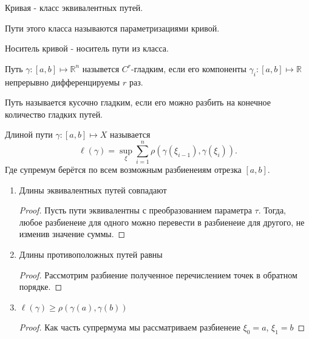 \begin{definition}[Кривая] \thmslashn 

    Кривая - класс эквивалентных путей.

    Пути этого класса называются параметризациями кривой.

    Носитель кривой - носитель пути из класса.
\end{definition}
\begin{definition} \thmslashn 

    Путь $\gamma : [a, b] \mapsto \mathbb{R}^{n}$ назывется $C^{r}$-гладким, если его компоненты $\gamma_{i} : [a, b] \mapsto \mathbb{R}$ непрерывно дифференцируемы $r$ раз.
\end{definition}
\begin{definition} \thmslashn 

    Путь называется кусочно гладким, если его можно разбить на конечное количество гладких путей.
\end{definition}
\begin{definition} \thmslashn 

    Длиной пути $\gamma : [a, b] \mapsto X$ называется
    \[ \ell(\gamma) = \sup\limits_{\xi} \sum\limits_{i=1}^{n} \rho(\gamma(\xi_{i-1}), \gamma(\xi_{i})) .\]
    Где супремум берётся по всем возможным разбиенеиям отрезка $[a, b]$.
\end{definition}
\begin{properties} \thmslashn

   \begin{enumerate}
       \item Длины эквивалентных путей совпадают
        \begin{proof} \thmslashn
        
            Пусть пути эквивалентны с преобразованием параметра $\tau$. Тогда, любое разбиенеие для одного можно перевести в разбиенеие для другого, не изменив значение суммы.
        \end{proof}
       \item Длины противоположных путей равны
        \begin{proof} \thmslashn
        
            Рассмотрим разбиение полученное перечислением точек в обратном порядке.
        \end{proof}
        \item $\ell(\gamma) \ge \rho(\gamma(a), \gamma(b))$
        \begin{proof} \thmslashn
        
            Как часть супрермума мы рассматриваем разбиенеие $\xi_{0} = a$, $\xi_{1} = b$
        \end{proof}
   \end{enumerate} 
\end{properties}

